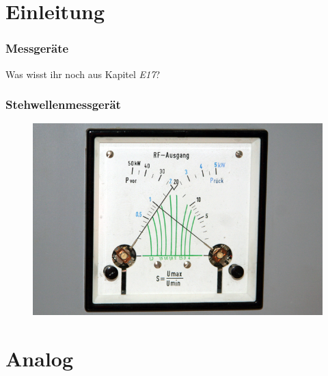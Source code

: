 

\subtitle{Technik A 16: \\
  Messtechnik \\[2em]}
\date{Stand 20.03.2017}


\section*{Einleitung}

\begin{frame}
  \frametitle{Messgeräte}
  {\Large Was wisst ihr noch aus Kapitel \emph{E17}?}
\end{frame}

\begin{frame}
  \frametitle{Stehwellenmessgerät}
  \begin{center}
    \begin{figure}
      \includegraphics[width=1\textwidth,height=.7\textheight,keepaspectratio]{a16/RS_SWR.jpg}
    \end{figure}
  \end{center}
\end{frame}

\section*{Analog}

